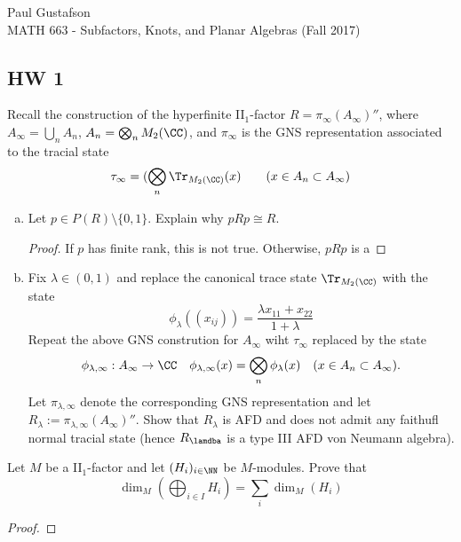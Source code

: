 \documentclass{article}
\begin{document}
\noindent Paul Gustafson\\
\noindent MATH 663 - Subfactors, Knots, and Planar Algebras (Fall 2017)

\subsection*{HW 1}
 Recall the construction of the hyperfinite II$_1$-factor $R = \pi_\infty(A_\infty)''$, where $A_\infty = \bigcup_n A_n$, $A_n = \bigotimes_n M_2(\CC)$, and $\pi_\infty$ is the GNS representation associated to the tracial state
$$ \tau_\infty = (\bigotimes_n \Tr_{M_2(\CC)}(x) \qquad (x \in A_n \subset A_\infty) $$
\begin{enumerate}[(a)]
\item Let $p \in P(R)\setminus \{0,1\}$. Explain why $pRp \cong R$.
  \begin{proof}
    If $p$ has finite rank, this is not true.  Otherwise, $pRp$ is a 
  \end{proof}

\item Fix $\lambda \in (0,1)$ and replace the canonical trace state $\Tr_{M_2(\CC)}$ with the state
  $$ \phi_\lambda((x_{ij})) = \frac{\lambda x_{11} + x_{22}}{1 + \lambda} $$
  Repeat the above GNS constrution for $A_\infty$ wiht $\tau_\infty$ replaced by
  the state
  $$\phi_{\lambda,\infty}:A_\infty \to \CC \quad \phi_{\lambda,\infty}(x) = \bigotimes_n\phi_\lambda(x) \quad (x \in A_n \subset A_\infty).$$
  Let $\pi_{\lambda,\infty}$ denote the corresponding GNS representation and
  let $R_\lambda := \pi_{\lambda, \infty}(A_\infty)''$.
  Show that $R_\lambda$ is AFD and does not admit any faithufl normal tracial state (hence $R_\lamdba$ is a type III AFD von Neumann algebra).
\end{enumerate}

 Let $M$ be a II$_1$-factor and let $(H_i)_{i \in \NN}$ be $M$-modules. Prove that
$$\dim_M \left( \bigoplus_{i\in I} H_i \right) = \sum_i \dim_M(H_i)$$
\begin{proof}
  
\end{proof}
\end{document}
